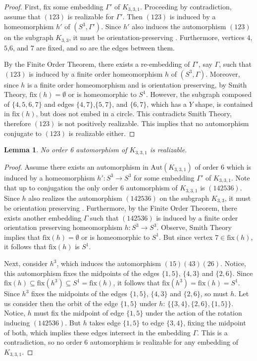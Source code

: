 \documentclass[11]{amsart}
\def\fix{{\mathrm{fix}}}
\def\Aut{{\mathrm{Aut}}}
\newtheorem{lemma}[theorem]{Lemma}
\theoremstyle{definition}
\theoremstyle{remark}
\begin{document}
    \begin{proof}
First, fix some embedding $\Gamma'$ of $K_{3,3,1}$.  Proceeding by contradiction, assume that $(123)$ is realizable for $\Gamma'$. Then $(123)$ is induced by a homeomorphism $h'$ of $(S^3,\Gamma')$.  Since $h'$ also induces the automorphism $(123)$ on the subgraph $K_{3,3}$, it must be orientation-preserving \cite{nt}. Furthermore, vertices $4$,$5$,$6$, and $7$ are fixed, and so are the edges between them. 

By the Finite Order Theorem, there exists a re-embedding of $\Gamma'$, say $\Gamma$, such that $(123)$ is induced by a finite order homeomorphism $h$ of $(S^3, \Gamma)$. Moreover, since $h$ is a finite order homeomorphism and is orientation preserving, by Smith Theory, $\fix(h)=\emptyset$ or is homeomorphic to $S^1$. However, the subgraph composed of $\{4,5,6,7\}$ and edges $\{4,7\}$,$\{5,7\}$, and $\{6,7\}$, which has a $Y$ shape, is contained in $\fix(h)$, but does not embed in a circle.  This contradicts Smith Theory, therefore $(123)$ is not positively realizable. This implies that no automorphism conjugate to $(123)$ is realizable either.
    \end{proof}
    

\begin{lemma}
\label{no6cycle}
    No order 6 automorphism of $K_{3,3,1}$ is realizable.
\end{lemma}
    \begin{proof}
        Assume there exists an automorphism in $\Aut(K_{3,3,1})$ of order $6$ which is induced by a homeomorphism $h':S^3\rightarrow S^3$ for some embedding $\Gamma'$ of $K_{3,3,1}$. Note that up to conjugation the only order $6$ automorphism of $K_{3,3,1}$ is $(142536)$. Since $h$ also realizes the automorphism $(142536)$ on the subgraph $K_{3,3}$, it must be orientation preserving \cite{nt}. Furthermore, by the Finite Order Theorem, there exists another embedding $\Gamma$ such that $(142536)$ is induced by a finite order orientation preserving homeomorphism $h:S^3\rightarrow S^3$.  Observe, Smith Theory implies that $\fix{(h)}=\emptyset$ or is homeomorphic to $S^1$. But since vertex $7 \in \fix{(h)}$, it follows that $\fix{(h)}$ is $S^1$. 
        
        Next, consider $h^3$, which induces the automorphism $(15)(43)(26)$. Notice, this automorphism fixes the midpoints of the edges $\{1,5\}$, $\{4,3\}$ and $\{2,6\}$. Since $\fix(h) \subseteq \fix{(h^3)} \subseteq S^1 = \fix(h)$, it follows that $\fix(h^3) = \fix(h) = S^1$.  Since $h^3$ fixes the midpoints of the edges $\{1,5\}$, $\{4,3\}$ and $\{2,6\}$, so must $h$. Let us consider then the orbit of the edge $\{1,5\}$ under $h$: $\{\{3,4\},\{2,6\},\{1,5\}\}$. Notice, $h$ must fix the midpoint of edge $\{1,5\}$ under the action of the rotation inducing $(142536)$. But $h$ takes edge $\{1,5\}$ to edge $\{3,4\}$, fixing the midpoint of both, which implies these edges intersect in the embedding $\Gamma$.  This is a contradiction, so no order 6 automorphism is realizable for any embedding of $K_{3,3,1}$. 
    \end{proof}
    
\end{document}
